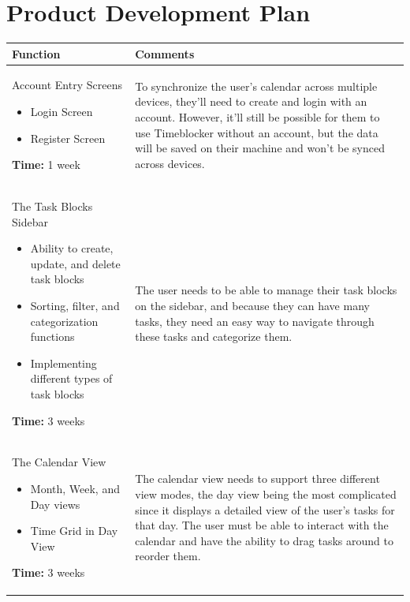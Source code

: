 \documentclass[12pt]{report}
\begin{document}
\section*{Product Development Plan}
\def\arraystretch{1.5}
\begin{tabularx}{\textwidth}{|X|X|}
	\hline
	Function
	 & Comments
	\\\hline
	Account Entry Screens
	\begin{itemize}
		\item Login Screen
		\item Register Screen
	\end{itemize}
	\textbf{Time:} 1 week
	 &
	To synchronize the user’s calendar across multiple devices, they’ll need to create and login with an account.
	However, it’ll still be possible for them to use Timeblocker without an account, but the data will be saved on their machine and won’t be synced across devices.
	\\\hline
	The Task Blocks Sidebar
	\begin{itemize}
		\item Ability to create, update, and delete task blocks
		\item Sorting, filter, and categorization functions
		\item Implementing different types of task blocks
	\end{itemize}
	\textbf{Time:} 3 weeks
	 &
	The user needs to be able to manage their task blocks on the sidebar, and because they can have many tasks, they need an easy way to navigate through these tasks and categorize them.
	\\\hline
	The Calendar View
	\begin{itemize}
		\item Month, Week, and Day views
		\item Time Grid in Day View
	\end{itemize}
	\textbf{Time:} 3 weeks
	 &
	The calendar view needs to support three different view modes, the day view being the most complicated since it displays a detailed view of the user’s tasks for that day.
	The user must be able to interact with the calendar and have the ability to drag tasks around to reorder them.
	\\\hline
\end{tabularx}
\end{document}
